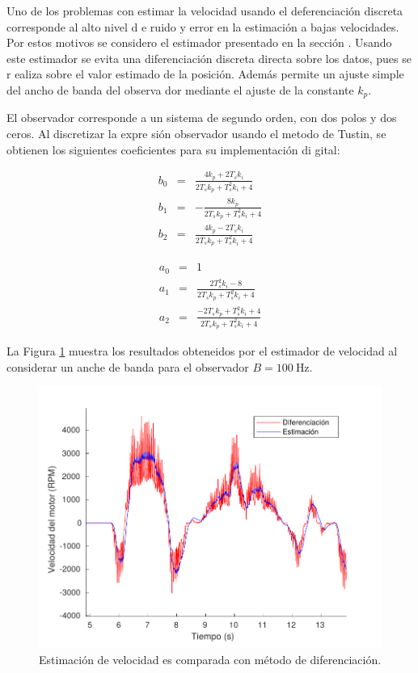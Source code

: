 Uno de los problemas con estimar la velocidad usando el deferenciación discreta corresponde al alto nivel d
e ruido y error en la estimación a bajas velocidades. Por estos motivos se considero el estimador presentado 
en la sección . Usando este estimador se evita una diferenciación discreta directa sobre los datos, pues se r
ealiza sobre el valor estimado de la posición. Además permite un ajuste simple del ancho de banda del observa
dor mediante el ajuste de la constante $k_p$.

El observador corresponde a un sistema de segundo orden, con dos polos y dos ceros. Al discretizar la expre
sión observador usando el metodo de Tustin, se obtienen los siguientes coeficientes para su implementación di
gital:

\begin{eqnarray}
b_0 &=& \frac{4 k_p + 2 T_s k_i}{2 T_s k_p + T_s^2 k_i + 4} \\
b_1 &=& -\frac{ 8 k_p}{2 T_s k_p + T_s^2 k_i + 4}\\
b_2 &=& \frac{4 k_p - 2 T_s k_i}{2 T_s k_p + T_s^2 k_i + 4}
\end{eqnarray}

\begin{eqnarray}
a_0 &=& 1 \\
a_1 &=& \frac{ 2 T_s^2 k_i - 8}{2 T_s k_p + T_s^2 k_i + 4}\\
a_2 &=& \frac{-2 T_s k_p  + T_s^2 k_i + 4}{2 T_s k_p + T_s^2 k_i + 4}
\end{eqnarray}

La Figura \ref{cap4_est_velocidad} muestra los resultados obteneidos por el estimador de velocidad al considerar un anche de banda para el observador $B = \SI{100}{\hertz}$.

\begin{figure}[ht]
	\centering
	\includegraphics[scale=0.6]{img/cap4/velocidad_estimacion}
	\caption{Estimación de velocidad es comparada con método de diferenciación.}
	\label{cap4_est_velocidad}
\end{figure}





